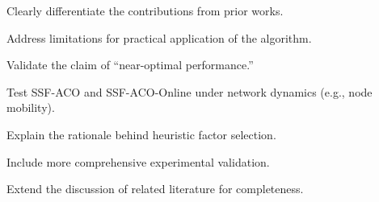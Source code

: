 \editor


\begin{metacomment}
	Clearly differentiate the contributions from prior works.
\end{metacomment}
\begin{metaresponse}%
\end{metaresponse}

\begin{metacomment}
	Address limitations for practical application of the algorithm.
\end{metacomment}
\begin{metaresponse}
	
\end{metaresponse}

\begin{metacomment}
	Validate the claim of ``near-optimal performance.''
\end{metacomment}
\begin{metaresponse}
	
\end{metaresponse}

\begin{metacomment}
	Test SSF-ACO and SSF-ACO-Online under network dynamics (e.g., node mobility).
\end{metacomment}
\begin{metaresponse}
	
\end{metaresponse}

\begin{metacomment}
	Explain the rationale behind heuristic factor selection.
\end{metacomment}
\begin{metaresponse}
	
\end{metaresponse}

\begin{metacomment}
	Include more comprehensive experimental validation.
\end{metacomment}
\begin{metaresponse}
	
\end{metaresponse}

\begin{metacomment}
	Extend the discussion of related literature for completeness.
\end{metacomment}
\begin{metaresponse}

\end{metaresponse}